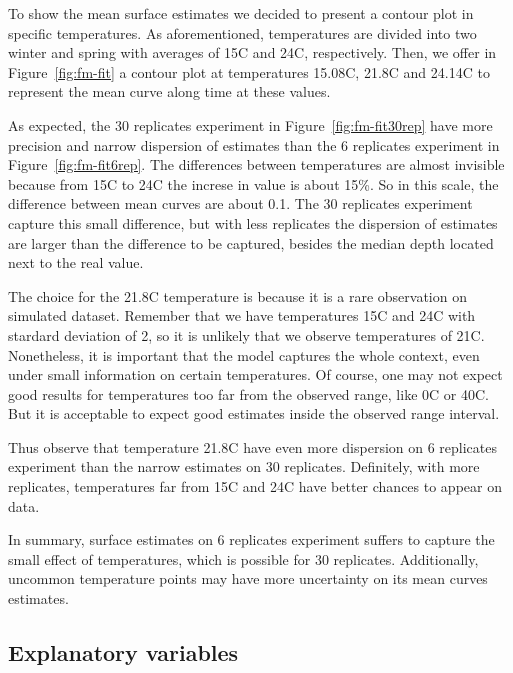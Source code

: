 To show the mean surface estimates we decided to present a contour plot in specific temperatures. As aforementioned, temperatures are divided into two winter and spring with averages of 15\textdegree C and 24\textdegree C, respectively. Then, we offer in Figure~\ref{fig:fm-fit} a contour plot at temperatures 15.08\textdegree C, 21.8\textdegree C and 24.14\textdegree C to represent the mean curve along time at these values.

As expected, the 30 replicates experiment in Figure~\ref{fig:fm-fit30rep} have more precision and narrow dispersion of estimates than the 6 replicates experiment in Figure~\ref{fig:fm-fit6rep}. The differences between temperatures are almost invisible because from 15\textdegree C to 24\textdegree C the increse in value is about 15\%. So in this scale, the difference between mean curves are about 0.1. The 30 replicates experiment capture this small difference, but with less replicates the dispersion of estimates are larger than the difference to be captured, besides the median depth located next to the real value.

The choice for the 21.8\textdegree C temperature is because it is a rare observation on simulated dataset. Remember that we have temperatures 15\textdegree C and 24\textdegree C with stardard deviation of 2, so it is unlikely that we observe temperatures of 21\textdegree C. Nonetheless, it is important that the model captures the whole context, even under small information on certain temperatures. Of course, one may not expect good results for temperatures too far from the observed range, like 0\textdegree C or 40\textdegree C. But it is acceptable to expect good estimates inside the observed range interval.

Thus observe that temperature 21.8\textdegree C have even more dispersion on 6 replicates experiment than the narrow estimates on 30 replicates. Definitely, with more replicates, temperatures far from 15\textdegree C and 24\textdegree C have better chances to appear on data. 


In summary, surface estimates on 6 replicates experiment suffers to capture the small effect of temperatures, which is possible for 30 replicates. Additionally, uncommon temperature points may have more uncertainty on its mean curves estimates. 


\subsection{Explanatory variables}
\label{sec:fm-covariates}





